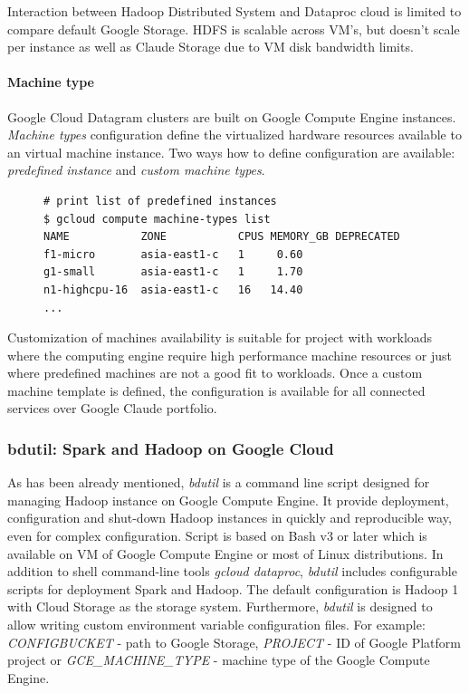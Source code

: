 \documentclass[a4paper,12pt,oneside]{report}
\begin{document}
Interaction between Hadoop Distributed System and Dataproc cloud is limited to compare default 
Google Storage. HDFS is scalable across VM’s, but doesn’t scale per instance as well as Claude Storage due to VM disk bandwidth limits. 

\paragraph{Machine type} Google Cloud Datagram clusters are built on Google Compute Engine instances.
\textit{Machine types} configuration define the virtualized hardware resources available to an 
virtual machine instance. Two ways how to define configuration are available: \textit{predefined instance} and \textit{custom machine types}.  
\begin{figure}[!htbp]\lstset{extendedchars=false,escapeinside=''}
\begin{lstlisting}[style=mybash]
# print list of predefined instances
$ gcloud compute machine-types list
NAME           ZONE           CPUS MEMORY_GB DEPRECATED
f1-micro       asia-east1-c   1     0.60
g1-small       asia-east1-c   1     1.70
n1-highcpu-16  asia-east1-c   16   14.40
...
\end{lstlisting} \end{figure}

Customization of machines availability is suitable for project with workloads where the computing engine require high performance machine resources or just where predefined machines are not a good fit to workloads. Once a custom machine template is defined, the configuration is available for all connected services over Google Claude portfolio.

\subsubsection{bdutil: Spark and Hadoop on Google Cloud}\label{subsub:bdutil}
As has been already mentioned, \textit{bdutil} is a command line script designed for
managing Hadoop instance on Google Compute Engine. It provide deployment, configuration
and shut-down Hadoop instances in quickly and reproducible way, even for complex configuration. Script is based on Bash v3 or later which is available on VM of Google Compute Engine or most of Linux distributions. In addition to shell command-line
tools \textit{gcloud dataproc}, \textit{bdutil} includes configurable scripts for deployment 
Spark and Hadoop. The default configuration is Hadoop 1 with Cloud Storage as the storage system. 
Furthermore, \textit{bdutil} is designed to allow writing custom environment variable configuration 
files. For example: \emph{CONFIGBUCKET} - path to Google Storage, \emph{PROJECT} - ID of Google Platform 
project or \emph{GCE\_MACHINE\_TYPE} - machine type of the Google Compute Engine.
\end{document}
